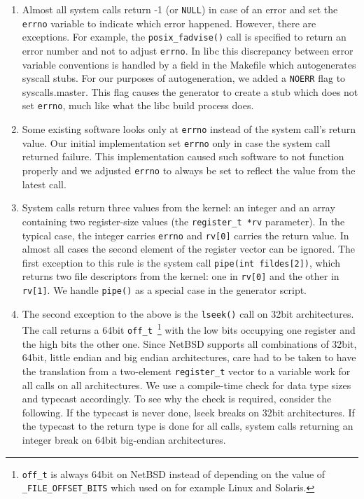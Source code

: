 \begin{enumerate}
\item   Almost all system calls return -1 (or \texttt{NULL}) in
	case of an error and set the \texttt{errno} variable to
	indicate which error happened.  However, there are exceptions.
	For example, the
	\verb+posix_fadvise()+ call is specified to return an error number
	and not to adjust \texttt{errno}.  In libc
	this discrepancy between error variable
	conventions is handled by a field in the Makefile which
	autogenerates syscall stubs.  For our purposes of
	autogeneration, we added a \texttt{NOERR} flag to
	syscalls.master.  This flag causes the generator to create
	a stub which does not set \texttt{errno}, much like what
	the libc build process does.

\item   Some existing software looks only at \texttt{errno} instead
	of the system call's return value.  Our initial implementation
	set \texttt{errno} only in case the system call returned failure.
	This implementation caused such software to not function properly
	and we adjusted \texttt{errno} to always be set to reflect the
	value from the latest call.

\item   System calls return three values from the kernel:
	an integer and an array containing two register-size values
	(the \verb+register_t *rv+ parameter).  In the typical
	case, the integer carries \texttt{errno} and \texttt{rv[0]}
	carries the return value.  In almost all cases the second
	element of the register vector can be ignored.  The first
	exception to this rule is the system call \texttt{pipe(int
	fildes[2])}, which returns two file descriptors from
	the kernel:  one in \texttt{rv[0]} and the other in
	\texttt{rv[1]}.  We handle \texttt{pipe()} as a special
	case in the generator script.

\item   The second exception to the above is the \texttt{lseek()}
	call on 32bit architectures.  The call returns a 64bit
	\verb+off_t+~\footnote
	{
		\texttt{off\_t} is always 64bit on NetBSD
		instead of depending on the value of
		\texttt{\_FILE\_OFFSET\_BITS} which used on for
		example Linux and Solaris.
	}
	with the low bits occupying one register and the high
	bits the other one.  Since NetBSD supports all combinations
	of 32bit, 64bit, little endian and big endian architectures,
	care had to be taken to have the translation from a
	two-element \verb+register_t+ vector to a variable work
	for all calls on all architectures.  We use a
	compile-time check for data type sizes and typecast
	accordingly.  To see why the check is required, consider
	the following.  If the typecast is never done, lseek breaks on
	32bit architectures.  If the typecast to the return type is
	done for all calls, system calls returning an integer break on
	64bit big-endian architectures.


\end{enumerate}
